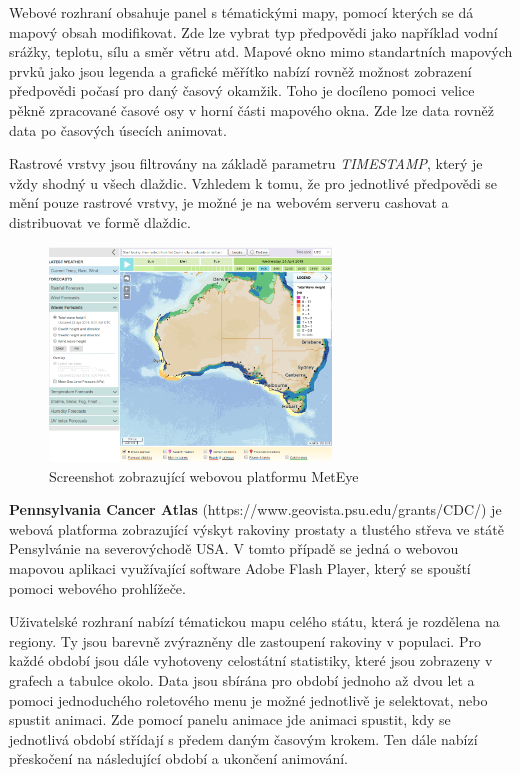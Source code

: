 Webové rozhraní obsahuje panel s tématickými mapy, pomocí kterých se
dá mapový obsah modifikovat. Zde lze vybrat typ předpovědi jako
například vodní srážky, teplotu, sílu a směr větru atd. Mapové okno
mimo standartních mapových prvků jako jsou legenda a grafické měřítko
nabízí rovněž možnost zobrazení předpovědi počasí pro daný časový
okamžik. Toho je docíleno pomoci velice pěkně zpracované časové osy v
horní části mapového okna. Zde lze data rovněž data po časových
úsecích animovat.

Rastrové vrstvy jsou filtrovány na základě parametru
\textit{TIMESTAMP}, který je vždy shodný u všech dlaždic. Vzhledem k
tomu, že pro jednotlivé předpovědi se mění pouze rastrové vrstvy, je
možné je na webovém serveru cashovat a distribuovat ve formě dlaždic.

\begin{figure}[h!]  \centering
\includegraphics[width=0.67\textwidth]{../img/meteye.png}
	\caption{Screenshot zobrazující webovou platformu MetEye}
	\label{fig:gay-sands}
\end{figure}

\textbf{Pennsylvania Cancer Atlas}
(https://www.geovista.psu.edu/grants/CDC/) je webová platforma
zobrazující výskyt rakoviny prostaty a tlustého střeva ve státě
Pensylvánie na severovýchodě USA. V tomto případě se jedná o webovou
mapovou aplikaci využívající software Adobe Flash Player, který se
spouští pomoci webového prohlížeče.

Uživatelské rozhraní nabízí tématickou mapu celého státu, která je
rozdělena na regiony. Ty jsou barevně zvýrazněny dle zastoupení
rakoviny v populaci. Pro každé období jsou dále vyhotoveny celostátní
statistiky, které jsou zobrazeny v grafech a tabulce okolo. Data jsou
sbírána pro období jednoho až dvou let a pomoci jednoduchého
roletového menu je možné jednotlivě je selektovat, nebo spustit
animaci. Zde pomocí panelu animace jde animaci spustit, kdy se
jednotlivá období střídají s předem daným časovým krokem. Ten dále
nabízí přeskočení na následující období a ukončení animování.

